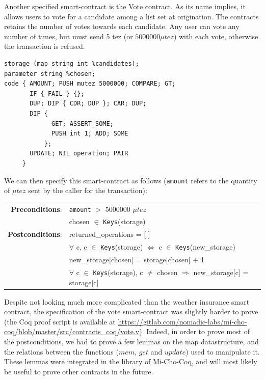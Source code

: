 \documentclass{report}
\begin{document}
Another specified smart-contract is the Vote contract. As its name implies, it allows users to vote for a candidate among a list set at origination. The contracts retains the number of votes towards each candidate. Any user can vote any number of times, but must send 5 tez (or $5000000\mu tez$) with each vote, otherwise the transaction is refused.

\begin{lstlisting}[language=michelson]
storage (map string int %candidates);
parameter string %chosen;
code { AMOUNT; PUSH mutez 5000000; COMPARE; GT;
       IF { FAIL } {};
       DUP; DIP { CDR; DUP }; CAR; DUP;
       DIP {
             GET; ASSERT_SOME;
             PUSH int 1; ADD; SOME
           };
       UPDATE; NIL operation; PAIR
     }
\end{lstlisting}

We can then specify this smart-contract as follows (\texttt{amount} refers to the quantity of $\mu tez$ sent by the caller for the transaction):
{\small
\begin{longtable}{rl}
  \textbf{Preconditions}: & \texttt{amount} $>$ 5000000 $\mu tez$\\
  & chosen $\in$ \texttt{Keys}(storage)\\
  \textbf{Postconditions}: & returned\_operations = [ ]\\
  & $\forall$ c, c $\in$ \texttt{Keys}(storage) $\iff$ c $\in$ \texttt{Keys}(new\_storage)\\
  & new\_storage[chosen] = storage[chosen] + 1\\
  & $\forall$ c $\in$ \texttt{Keys}(storage), c $\neq$ chosen $\Rightarrow$ new\_storage[c] = storage[c]
\end{longtable}}

Despite not looking much more complicated than the weather insurance smart contract, the specification of the vote smart-contract was slightly harder to prove (the Coq proof script is available at \url{https://gitlab.com/nomadic-labs/mi-cho-coq/blob/master/src/contracts_coq/vote.v}). Indeed, in order to prove most of the postconditions, we had to prove a few lemmas on the map datastructure, and the relations between the functions ($mem$, $get$ and $update$) used to manipulate it. These lemmas were integrated in the library of Mi-Cho-Coq, and will most likely be useful to prove other contracts in the future.

\end{document}
